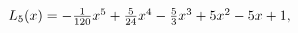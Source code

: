 $\mathop{L_{5}\/}\nolimits\!\left(x\right)=-\tfrac{1}{120}x^{5}+\tfrac{5}{24}x^%
{4}-\tfrac{5}{3}x^{3}+5x^{2}-5x+1,$